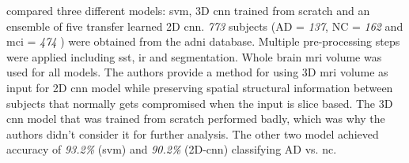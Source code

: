 \textcite{nanniComparisonTransferLearning2020} compared three different models: \gls{svm}, 3D \gls{cnn} trained from scratch and an ensemble of five transfer learned 2D \gls{cnn}. \textit{773} subjects (AD = \textit{137},  NC = \textit{162} and \gls{mci} =  \textit{474} ) were obtained from the \gls{adni} database. Multiple pre-processing steps were applied including \gls{sst}, \gls{ir} and segmentation. Whole brain \gls{mri} volume was used for all models. The authors provide a method for using 3D \gls{mri} volume as input for 2D \gls{cnn} model while preserving spatial structural information between subjects that normally gets compromised when the input is slice based. The 3D \gls{cnn} model that was trained from scratch performed badly, which was why the authors didn't consider it for further analysis. The other two model achieved accuracy of \textit{93.2\%} (\gls{svm}) and \textit{90.2\%} (2D-\gls{cnn}) classifying \gls{AD} vs. \gls{nc}. 







